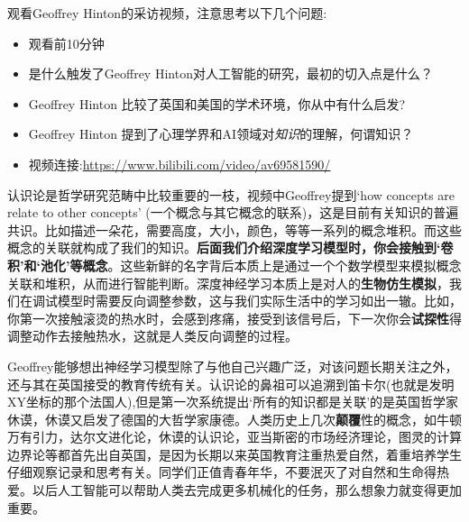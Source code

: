 \documentclass[12pt]{article}
\numberwithin{figure}{section}
\newenvironment{fullmodel}{
			\smallskip\noindent
			\begin{minipage}{\textwidth+\marginparwidth+\marginparsep}\smallskip\smallskip}
			{\smallskip\smallskip\end{minipage}\vspace{.1in}
			}
\numberwithin{equation}{section}
\begin{document}
观看Geoffrey Hinton的采访视频，注意思考以下几个问题:
\begin{itemize}
	\item 观看前10分钟
	\item 是什么触发了Geoffrey Hinton对人工智能的研究，最初的切入点是什么？
	\item Geoffrey Hinton 比较了英国和美国的学术环境，你从中有什么启发?
	\item Geoffrey Hinton 提到了心理学界和AI领域对\textit{知识}的理解，何谓知识？
	\item 视频连接:\url{https://www.bilibili.com/video/av69581590/}
\end{itemize}


\begin{fullmodel}
	\begin{tcolorbox}[title={哲学延伸},fonttitle=\large,colframe=medblue]
		   认识论是哲学研究范畴中比较重要的一枝，视频中Geoffrey提到`how concepts are relate to other concepts' (一个概念与其它概念的联系)，这是目前有关知识的普遍共识。比如描述一朵花，需要高度，大小，颜色，等等一系列的概念堆积。而这些概念的关联就构成了我们的知识。\textbf{后面我们介绍深度学习模型时，你会接触到`卷积'和`池化'等概念}。这些新鲜的名字背后本质上是通过一个个数学模型来模拟概念关联和堆积，从而进行智能判断。深度神经学习本质上是对人的\textbf{生物仿生模拟}，我们在调试模型时需要反向调整参数，这与我们实际生活中的学习如出一辙。比如，你第一次接触滚烫的热水时，会感到疼痛，接受到该信号后，下一次你会\textbf{试探性}得调整动作去接触热水，这就是人类反向调整的过程。
		   
		\setlength{\parindent}{5ex}
		Geoffrey能够想出神经学习模型除了与他自己兴趣广泛，对该问题长期关注之外，还与其在英国接受的教育传统有关。认识论的鼻祖可以追溯到笛卡尔(也就是发明XY坐标的那个法国人),但是第一次系统提出`所有的知识都是关联’的是英国哲学家休谟，休谟又启发了德国的大哲学家康德。人类历史上几次\textbf{颠覆}性的概念，如牛顿万有引力，达尔文进化论，休谟的认识论，亚当斯密的市场经济理论，图灵的计算边界论等都首先出自英国，是因为长期以来英国教育注重热爱自然，着重培养学生仔细观察记录和思考有关。同学们正值青春年华，不要泯灭了对自然和生命得热爱。以后人工智能可以帮助人类去完成更多机械化的任务，那么想象力就变得更加重要。
	\end{tcolorbox}
\end{fullmodel}
\end{document}
